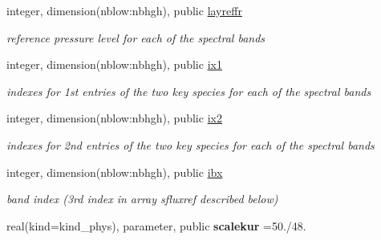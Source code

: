 \begin{Indent}
\begin{DoxyCompactItemize}
\mbox{\label{namespacemodule__radsw__sflux_a90c56da1bcadbea0b42e12487c1c1eec}} 
integer, dimension(nblow\+:nbhgh), public \hyperlink{namespacemodule__radsw__sflux_a90c56da1bcadbea0b42e12487c1c1eec}{layreffr}
\begin{DoxyCompactList}\small\item\em reference pressure level for each of the spectral bands \end{DoxyCompactList}\item 
\mbox{\label{namespacemodule__radsw__sflux_ac2864b4501e9bc3804d45d14f4aab472}} 
integer, dimension(nblow\+:nbhgh), public \hyperlink{namespacemodule__radsw__sflux_ac2864b4501e9bc3804d45d14f4aab472}{ix1}
\begin{DoxyCompactList}\small\item\em indexes for 1st entries of the two key species for each of the spectral bands \end{DoxyCompactList}\item 
\mbox{\label{namespacemodule__radsw__sflux_a92703c3e826f7e81267c6b7ae31ebe42}} 
integer, dimension(nblow\+:nbhgh), public \hyperlink{namespacemodule__radsw__sflux_a92703c3e826f7e81267c6b7ae31ebe42}{ix2}
\begin{DoxyCompactList}\small\item\em indexes for 2nd entries of the two key species for each of the spectral bands \end{DoxyCompactList}\item 
\mbox{\label{namespacemodule__radsw__sflux_acb1498ecf044449dbe6d7a5630fdc375}} 
integer, dimension(nblow\+:nbhgh), public \hyperlink{namespacemodule__radsw__sflux_acb1498ecf044449dbe6d7a5630fdc375}{ibx}
\begin{DoxyCompactList}\small\item\em band index (3rd index in array sfluxref described below) \end{DoxyCompactList}\item 
\mbox{\label{namespacemodule__radsw__sflux_a2f3280a36f27cea89fc66d71e799cf6d}} 
real(kind=kind\+\_\+phys), parameter, public {\bfseries scalekur} =50./48.
\item 
\mbox{\label{namespacemodule__radsw__sflux_a84205f359fb3e1a0e1d03e755c52dc78}} 

\end{DoxyCompactItemize}
\end{Indent}
